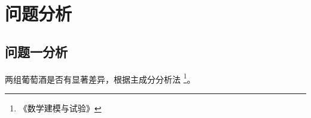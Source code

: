 \documentclass{cumcmthesis}
\begin{document}
	
	
	
	\section{问题分析}
	
	\subsection{问题一分析}
	两组葡萄酒是否有显著差异，根据主成分分析法 \footnote{《数学建模与试验》}。 
	
\end{document}
